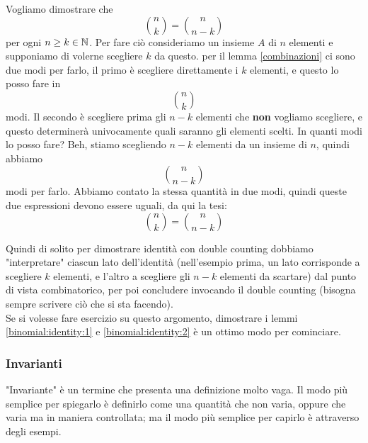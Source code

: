 \documentclass[11pt]{scrartcl}
\begin{document}
	\begin{example}
		Vogliamo dimostrare che $$\binom{n}{k}=\binom{n}{n-k}$$ per ogni $n\ge k \in \mathbb N$. Per fare ciò consideriamo un insieme $A$ di $n$ elementi e supponiamo di volerne scegliere $k$ da questo. per il lemma \ref{combinazioni} ci sono due modi per farlo, il primo è scegliere direttamente i $k$ elementi, e questo lo posso fare in
		$$\binom{n}{k}$$
		modi. Il secondo è scegliere prima gli $n-k$ elementi che \textbf{non} vogliamo scegliere, e questo determinerà univocamente quali saranno gli elementi scelti. In quanti modi lo posso fare? Beh, stiamo scegliendo $n-k$ elementi da un insieme di $n$, quindi abbiamo
		$$\binom{n}{n-k}$$
		modi per farlo. Abbiamo contato la stessa quantità in due modi, quindi queste due espressioni devono essere uguali, da qui la tesi:
		$$\binom{n}{k}=\binom{n}{n-k}$$
	\end{example}
	Quindi di solito per dimostrare identità con double counting dobbiamo "interpretare" ciascun lato dell'identità (nell'esempio prima, un lato corrisponde a scegliere $k$ elementi, e l'altro a scegliere gli $n-k$ elementi da scartare) dal punto di vista combinatorico, per poi concludere invocando il double counting (bisogna sempre scrivere ciò che si sta facendo). \\
	Se si volesse fare esercizio su questo argomento, dimostrare i lemmi \ref{binomial:identity:1} e \ref{binomial:identity:2} è un ottimo modo per cominciare.
	
	\subsubsection{Invarianti}
	"Invariante" è un termine che presenta una definizione molto vaga. Il modo più semplice per spiegarlo è definirlo come una quantità che non varia, oppure che varia ma in maniera controllata; ma il modo più semplice per capirlo è attraverso degli esempi.
	
\end{document}
